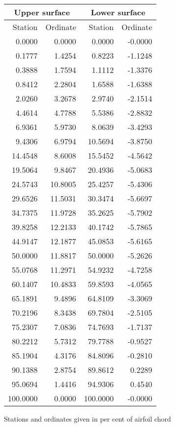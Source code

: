 \documentclass[11pt]{book}
\begin{document}
 \hspace{4mm}
 \begin{tabular}{|r|r|r|r|} \hline 
 \multicolumn{2}{|c|}{Upper surface} & \multicolumn{2}{|c|}{Lower surface} \\
 \hline
 Station & Ordinate & Station & Ordinate \\
 \hline
0.0000 & 0.0000 & 0.0000 & -0.0000 \\
0.1777 & 1.4254 & 0.8223 & -1.1248 \\
0.3888 & 1.7594 & 1.1112 & -1.3376 \\
0.8412 & 2.2804 & 1.6588 & -1.6388 \\
2.0260 & 3.2678 & 2.9740 & -2.1514 \\
4.4614 & 4.7788 & 5.5386 & -2.8832 \\
6.9361 & 5.9730 & 8.0639 & -3.4293 \\
9.4306 & 6.9794 & 10.5694 & -3.8750 \\
14.4548 & 8.6008 & 15.5452 & -4.5642 \\
19.5064 & 9.8467 & 20.4936 & -5.0683 \\
24.5743 & 10.8005 & 25.4257 & -5.4306 \\
29.6526 & 11.5031 & 30.3474 & -5.6697 \\
34.7375 & 11.9728 & 35.2625 & -5.7902 \\
39.8258 & 12.2133 & 40.1742 & -5.7865 \\
44.9147 & 12.1877 & 45.0853 & -5.6165 \\
50.0000 & 11.8817 & 50.0000 & -5.2626 \\
55.0768 & 11.2971 & 54.9232 & -4.7258 \\
60.1407 & 10.4833 & 59.8593 & -4.0565 \\
65.1891 & 9.4896 & 64.8109 & -3.3069 \\
70.2196 & 8.3438 & 69.7804 & -2.5105 \\
75.2307 & 7.0836 & 74.7693 & -1.7137 \\
80.2212 & 5.7312 & 79.7788 & -0.9527 \\
85.1904 & 4.3176 & 84.8096 & -0.2810 \\
90.1388 & 2.8754 & 89.8612 & 0.2289 \\
95.0694 & 1.4416 & 94.9306 & 0.4540 \\
100.0000 & 0.0000 & 100.0000 & -0.0000 \\
 \hline 
 \end{tabular}
 \vspace{8mm}

Stations and ordinates given in per cent of airfoil chord
\end{document}
